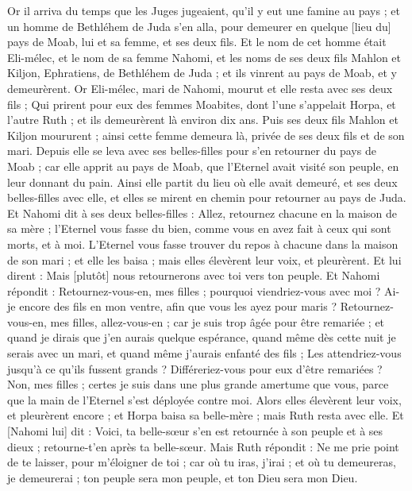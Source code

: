 \BFont
\begin{multicols}{2}
\VerseOne{}Or il arriva du temps que les Juges jugeaient, qu'il y eut une famine au pays ; et un homme de Bethléhem de Juda s'en alla, pour demeurer en quelque [lieu du] pays de Moab, lui et sa femme, et ses deux fils.
Et le nom de cet homme était Eli-mélec, et le nom de sa femme Nahomi, et les noms de ses deux fils Mahlon et Kiljon, Ephratiens, de Bethléhem de Juda ; et ils vinrent au pays de Moab, et y demeurèrent.
Or Eli-mélec, mari de Nahomi, mourut et elle resta avec ses deux fils ;
Qui prirent pour eux des femmes Moabites, dont l'une s'appelait Horpa, et l'autre Ruth ; et ils demeurèrent là environ dix ans.
Puis ses deux fils Mahlon et Kiljon moururent ; ainsi cette femme demeura là, privée de ses deux fils et de son mari.
Depuis elle se leva avec ses belles-filles pour s'en retourner du pays de Moab ; car elle apprit au pays de Moab, que l'Eternel avait visité son peuple, en leur donnant du pain.
Ainsi elle partit du lieu où elle avait demeuré, et ses deux belles-filles avec elle, et elles se mirent en chemin pour retourner au pays de Juda.
Et Nahomi dit à ses deux belles-filles : Allez, retournez chacune en la maison de sa mère ; l'Eternel vous fasse du bien, comme vous en avez fait à ceux qui sont morts, et à moi.
L'Eternel vous fasse trouver du repos à chacune dans la maison de son mari ; et elle les baisa ; mais elles élevèrent leur voix, et pleurèrent.
Et lui dirent : Mais [plutôt] nous retournerons avec toi vers ton peuple.
Et Nahomi répondit : Retournez-vous-en, mes filles ; pourquoi viendriez-vous avec moi ? Ai-je encore des fils en mon ventre, afin que vous les ayez pour maris ?
Retournez-vous-en, mes filles, allez-vous-en ; car je suis trop âgée pour être remariée ; et quand je dirais que j'en aurais quelque espérance, quand même dès cette nuit je serais avec un mari, et quand même j'aurais enfanté des fils ;
Les attendriez-vous jusqu'à ce qu'ils fussent grands ? Différeriez-vous pour eux d'être remariées ? Non, mes filles ; certes je suis dans une plus grande amertume que vous, parce que la main de l'Eternel s'est déployée contre moi.
Alors elles élevèrent leur voix, et pleurèrent encore ; et Horpa baisa sa belle-mère ; mais Ruth resta avec elle.
Et [Nahomi lui] dit : Voici, ta belle-sœur s'en est retournée à son peuple et à ses dieux ; retourne-t'en après ta belle-sœur.
Mais Ruth répondit : Ne me prie point de te laisser, pour m'éloigner de toi ; car où tu iras, j'irai ; et où tu demeureras, je demeurerai ; ton peuple sera mon peuple, et ton Dieu sera mon Dieu.

\end{multicols}
